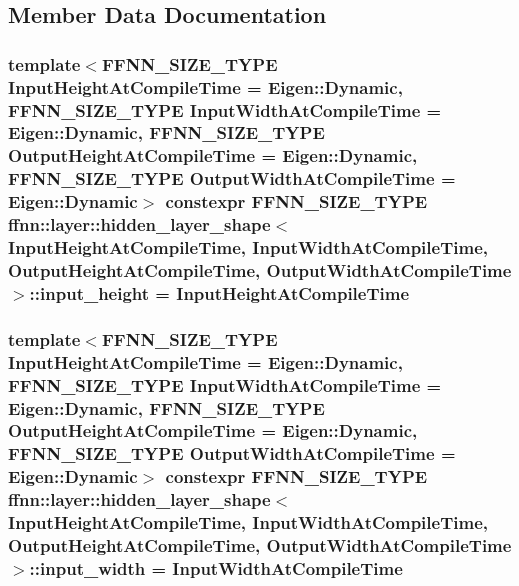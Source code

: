 \subsection{Member Data Documentation}
\hypertarget{structffnn_1_1layer_1_1hidden__layer__shape_a8a49644e6568f49b4e25537a4fe3ec48}{
\subsubsection[{input\-\_\-height}]{\setlength{\rightskip}{0pt plus 5cm}template$<$F\-F\-N\-N\-\_\-\-S\-I\-Z\-E\-\_\-\-T\-Y\-P\-E Input\-Height\-At\-Compile\-Time = Eigen\-::\-Dynamic, F\-F\-N\-N\-\_\-\-S\-I\-Z\-E\-\_\-\-T\-Y\-P\-E Input\-Width\-At\-Compile\-Time = Eigen\-::\-Dynamic, F\-F\-N\-N\-\_\-\-S\-I\-Z\-E\-\_\-\-T\-Y\-P\-E Output\-Height\-At\-Compile\-Time = Eigen\-::\-Dynamic, F\-F\-N\-N\-\_\-\-S\-I\-Z\-E\-\_\-\-T\-Y\-P\-E Output\-Width\-At\-Compile\-Time = Eigen\-::\-Dynamic$>$ constexpr {\bf F\-F\-N\-N\-\_\-\-S\-I\-Z\-E\-\_\-\-T\-Y\-P\-E} {\bf ffnn\-::layer\-::hidden\-\_\-layer\-\_\-shape}$<$ Input\-Height\-At\-Compile\-Time, Input\-Width\-At\-Compile\-Time, Output\-Height\-At\-Compile\-Time, Output\-Width\-At\-Compile\-Time $>$\-::input\-\_\-height = Input\-Height\-At\-Compile\-Time\hspace{0.3cm}{\ttfamily [static]}}}\label{structffnn_1_1layer_1_1hidden__layer__shape_a8a49644e6568f49b4e25537a4fe3ec48}
\hypertarget{structffnn_1_1layer_1_1hidden__layer__shape_ae46937b13b70edec57e4d629b43c8ef8}{
\subsubsection[{input\-\_\-width}]{\setlength{\rightskip}{0pt plus 5cm}template$<$F\-F\-N\-N\-\_\-\-S\-I\-Z\-E\-\_\-\-T\-Y\-P\-E Input\-Height\-At\-Compile\-Time = Eigen\-::\-Dynamic, F\-F\-N\-N\-\_\-\-S\-I\-Z\-E\-\_\-\-T\-Y\-P\-E Input\-Width\-At\-Compile\-Time = Eigen\-::\-Dynamic, F\-F\-N\-N\-\_\-\-S\-I\-Z\-E\-\_\-\-T\-Y\-P\-E Output\-Height\-At\-Compile\-Time = Eigen\-::\-Dynamic, F\-F\-N\-N\-\_\-\-S\-I\-Z\-E\-\_\-\-T\-Y\-P\-E Output\-Width\-At\-Compile\-Time = Eigen\-::\-Dynamic$>$ constexpr {\bf F\-F\-N\-N\-\_\-\-S\-I\-Z\-E\-\_\-\-T\-Y\-P\-E} {\bf ffnn\-::layer\-::hidden\-\_\-layer\-\_\-shape}$<$ Input\-Height\-At\-Compile\-Time, Input\-Width\-At\-Compile\-Time, Output\-Height\-At\-Compile\-Time, Output\-Width\-At\-Compile\-Time $>$\-::input\-\_\-width = Input\-Width\-At\-Compile\-Time\hspace{0.3cm}{\ttfamily [static]}}}\label{structffnn_1_1layer_1_1hidden__layer__shape_ae46937b13b70edec57e4d629b43c8ef8}

